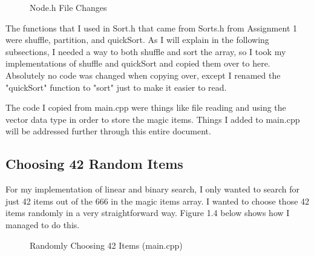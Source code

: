 \documentclass[letterpaper, 10pt]{article}
\begin{document}
\begin{figure}[H]
  \centering
  
  \label{fig:figure1.3-part1}
\end{figure}

\vspace{-2em}
\begin{figure}[H]
  \centering
  
  \caption{Node.h File Changes}
  \label{fig:figure1.3-part2}
\end{figure}

\noindent
The functions that I used in Sort.h that came from Sorts.h from Assignment 1 were shuffle, partition, and quickSort. As I will explain in the following subsections, I needed a way to both shuffle and sort the array, so I took my implementations of shuffle and quickSort and copied them over to here. Absolutely no code was changed when copying over, except I renamed the "quickSort" function to "sort" just to make it easier to read.

\vspace{1em}

\noindent
The code I copied from main.cpp were things like file reading and using the vector data type in order to store the magic items. Things I added to main.cpp will be addressed further through this entire document.

\subsection{Choosing 42 Random Items}
\noindent
For my implementation of linear and binary search, I only wanted to search for just 42 items out of the 666 in the magic items array. I wanted to choose those 42 items randomly in a very straightforward way. Figure 1.4 below shows how I managed to do this. 

\begin{figure}[H]
  \centering
  
  \label{fig:figure1.4-part1}
\end{figure}

\vspace{-2em}
\begin{figure}[H]
  \centering
  
  \caption{Randomly Choosing 42 Items (main.cpp)}
  \label{fig:figure1.4-part2}
\end{figure}
\end{document}

